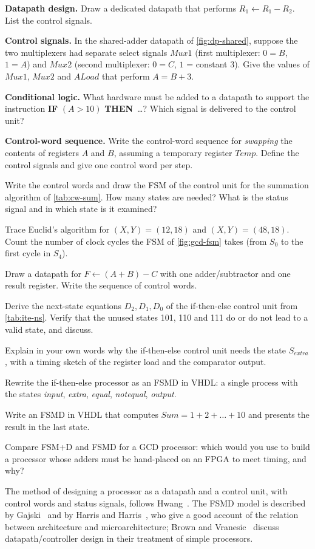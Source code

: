 \begin{exlist}
  \item \textbf{Datapath design.} Draw a dedicated datapath that performs $R_1\leftarrow R_1-R_2$. List the control signals.
  \item \textbf{Control signals.} In the shared-adder datapath of \cref{fig:dp-shared}, suppose the two multiplexers had separate select signals $Mux1$ (first multiplexer: $0=B$, $1=A$) and $Mux2$ (second multiplexer: $0=C$, $1$ = constant 3). Give the values of $Mux1$, $Mux2$ and $ALoad$ that perform $A=B+3$.
  \item \textbf{Conditional logic.} What hardware must be added to a datapath to support the instruction \textbf{IF} $(A>10)$ \textbf{THEN}~\dots? Which signal is delivered to the control unit?
  \item \textbf{Control-word sequence.} Write the control-word sequence for \emph{swapping} the contents of registers $A$ and $B$, assuming a temporary register $Temp$. Define the control signals and give one control word per step.
  \item Write the control words and draw the FSM of the control unit for the summation algorithm of \cref{tab:cw-sum}. How many states are needed? What is the status signal and in which state is it examined?
  \item Trace Euclid's algorithm for $(X,Y)=(12,18)$ and $(X,Y)=(48,18)$. Count the number of clock cycles the FSM of \cref{fig:gcd-fsm} takes (from $S_0$ to the first cycle in $S_4$).
  \item Draw a datapath for $F\leftarrow(A+B)-C$ with one adder/subtractor and one result register. Write the sequence of control words.
  \item Derive the next-state equations $D_2,D_1,D_0$ of the if-then-else control unit from \cref{tab:ite-ns}. Verify that the unused states 101, 110 and 111 do or do not lead to a valid state, and discuss.
  \item Explain in your own words why the if-then-else control unit needs the state $S_{extra}$, with a timing sketch of the register load and the comparator output.
  \item Rewrite the if-then-else processor as an FSMD in VHDL: a single process with the states \textit{input}, \textit{extra}, \textit{equal}, \textit{notequal}, \textit{output}.
  \item Write an FSMD in VHDL that computes $Sum=1+2+\dots+10$ and presents the result in the last state.
  \item Compare FSM+D and FSMD for a GCD processor: which would you use to build a processor whose adders must be hand-placed on an FPGA to meet timing, and why?
\end{exlist}

The method of designing a processor as a datapath and a control unit, with control words and status signals, follows Hwang~\cite{hwang2018,hwang2005}. The FSMD model is described by Gajski~\cite{gajski1997} and by Harris and Harris~\cite{harris2012}, who give a good account of the relation between architecture and microarchitecture; Brown and Vranesic~\cite{brown2009} discuss datapath/controller design in their treatment of simple processors.
